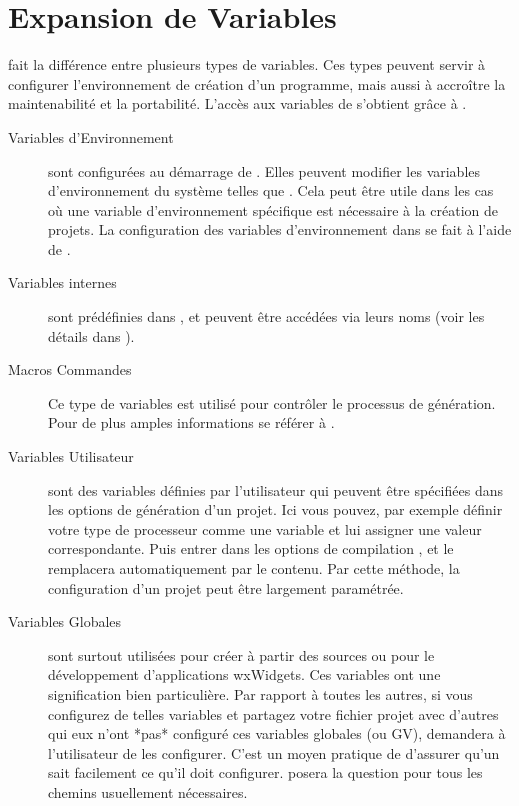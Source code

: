 \chapter{Expansion de Variables}\label{sec:variables_types}

\codeblocks fait la différence entre plusieurs types de variables. Ces types peuvent servir à configurer l'environnement de création d'un programme, mais aussi à accroître la maintenabilité et la portabilité. L'accès aux variables de \codeblocks s'obtient grâce à .


\begin{description}
\item[Variables d'Environnement] sont configurées au démarrage de \codeblocks. Elles peuvent modifier les variables d'environnement du système telles que . Cela peut être utile dans les cas où une variable d'environnement spécifique est nécessaire à la création de projets. La configuration des variables d'environnement dans \codeblocks se fait à l'aide de .
\item[Variables internes] sont prédéfinies dans \codeblocks, et peuvent être accédées via leurs noms (voir les détails dans ).
\item[Macros Commandes] Ce type de variables est utilisé pour contrôler le processus de génération. Pour de plus amples informations se référer à .
\item[Variables Utilisateur] sont des variables définies par l'utilisateur qui peuvent être spécifiées dans les options de génération d'un projet. Ici vous pouvez, par exemple définir votre type de processeur comme une variable  et lui assigner une valeur correspondante. Puis entrer dans les options de compilation , et \codeblocks le remplacera automatiquement par le contenu. Par cette méthode, la configuration d'un projet peut être largement paramétrée.
\item[Variables Globales] sont surtout utilisées pour créer \codeblocks à partir des sources ou pour le développement d'applications wxWidgets. Ces variables ont une signification bien particulière. Par rapport à toutes les autres, si vous configurez de telles variables et partagez votre fichier projet avec d'autres qui eux n'ont *pas* configuré ces variables globales (ou GV), \codeblocks demandera à l'utilisateur de les configurer. C'est un moyen pratique de d'assurer qu'un  sait facilement ce qu'il doit configurer. \codeblocks posera la question pour tous les chemins usuellement nécessaires.
\end{description}

